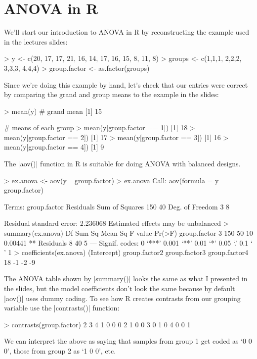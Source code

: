 
\section{ANOVA in R}

We'll start our introduction to ANOVA in R by reconstructing the example used in the lectures slides:

\begin{R}
> y <- c(20, 17, 17, 21, 16, 14, 17, 16, 15, 8, 11, 8)
> groups <- c(1,1,1, 2,2,2, 3,3,3, 4,4,4)
> group.factor <- as.factor(groups)
\end{R}
%
Since we're doing this example by hand, let's check that our entries were correct by comparing the grand and group means to the example in the slides:
%
\begin{R}
> mean(y)  # grand mean
[1] 15

# means of each group
> mean(y[group.factor == 1])
[1] 18
> mean(y[group.factor == 2])
[1] 17
> mean(y[group.factor == 3])
[1] 16
> mean(y[group.factor == 4])
[1] 9
\end{R}

The |aov()| function in R is suitable for doing ANOVA with balanced designs.
\begin{R}
> ex.anova <- aov(y ~ group.factor)
> ex.anova
Call:
   aov(formula = y ~ group.factor)

Terms:
                group.factor Residuals
Sum of Squares           150        40
Deg. of Freedom            3         8

Residual standard error: 2.236068 
Estimated effects may be unbalanced
> summary(ex.anova)
             Df Sum Sq Mean Sq F value  Pr(>F)   
group.factor  3    150      50      10 0.00441 **
Residuals     8     40       5                   
---
Signif. codes:  0 ‘***’ 0.001 ‘**’ 0.01 ‘*’ 0.05 ‘.’ 0.1 ‘ ’ 1   
> coefficients(ex.anova)
  (Intercept) group.factor2 group.factor3 group.factor4 
           18            -1            -2            -9 
\end{R}

The ANOVA table shown by |summary()| looks the same as what I presented in the slides, but the model coefficients don't look the same because by default |aov()| uses dummy coding. To see how R creates contrasts from our grouping variable use the |contrasts()| function:
\begin{R}
> contrasts(group.factor)
  2 3 4
1 0 0 0
2 1 0 0
3 0 1 0
4 0 0 1
\end{R}
%
We can interpret the above as saying that samples from group 1 get coded as `0 0 0', those from group 2 as `1 0 0', etc.

